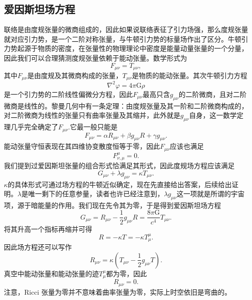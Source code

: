 \documentclass[11pt, a4paper, oneside, onecolumn]{ctexart}
\numberwithin{equation}{subsection}
\begin{document}
\subsection{爱因斯坦场方程}
联络是由度规张量的微商组成的，因此如果说联络表征了引力场强，那么度规张量就对应引力势，是一个二阶对称张量，与牛顿引力势的标量场作出了区分。牛顿引力势起源于物质的密度，在张量性的物理理论中密度是能量动量张量的一个分量，因此我们可以合理猜测度规张量依赖于能动张量。数学形式为
\begin{equation}
F_{\mu\nu}=T_{\mu\nu},
\end{equation}
其中$F_{\mu\nu}$是由度规及其微商构成的张量，$T_{\mu\nu}$是物质的能动张量。其次牛顿引力方程
\begin{equation}
\nabla^{2}\varphi=4\pi\mathrm{G}\rho
\end{equation}
是一个引力势的二阶线性偏微分方程，因此$F_{\mu\nu}$最高只含$g_{\mu\nu}$的二阶微商，且对二阶微商是线性的。黎曼几何中有一条定理：由度规张量及其一阶和二阶微商构成的，对二阶微商为线性的张量只有曲率张量及其缩并，此外就是$g_{\mu\nu}$自身，这一数学定理几乎完全确定了$F_{\mu\nu}$.它最一般只能是
\begin{equation}
F_{\mu\nu}=\alpha R_{\mu\nu}+\beta g_{\mu\nu}R+\gamma g_{\mu\nu}.
\end{equation}
能动张量守恒表现在其四维协变散度恒等于零，因此$F_{\mu\nu}$应该也满足
\begin{equation}
F^{\mu}_{\nu,\mu}=0.
\end{equation}
我们提到过爱因斯坦张量的组合形式恰满足其形式，因此度规场方程应该满足
\begin{equation}
G_{\mu\nu}+\lambda g_{\mu\nu}=\kappa T_{\mu\nu}.
\end{equation}
$\kappa$的具体形式可通过场方程的牛顿近似确定，现在先直接给出答案，后续给出证明。$\lambda$是唯一剩下的任意参量，读者也许已经注意到，$\lambda g_{\mu\nu}$这一项就是所谓的宇宙项，源于暗能量的作用。我们现在先令其为零，于是得到爱因斯坦场方程
\begin{equation}
G_{\mu\nu}=R_{\mu\nu}-\frac12g_{\mu\nu}R=\frac{8\pi\mathrm{G}}{c^{4}}T_{\mu\nu}.
\end{equation}
将其升高一个指标再缩并可得
\begin{equation}
R=-\kappa T=-\kappa T^{\mu}_{\mu}.
\end{equation}
因此场方程还可以写作
\begin{equation}
R_{\mu\nu}=\kappa\left(T_{\mu\nu}-\frac12g_{\mu\nu}T\right).
\end{equation}
真空中能动张量和能动张量的迹$T^{\mu}_{\mu}$都为零，因此
\begin{equation}
R_{\mu\nu}=0.
\end{equation}
注意，Ricci 张量为零并不意味着曲率张量为零，实际上时空依旧是弯曲的。
\end{document}
